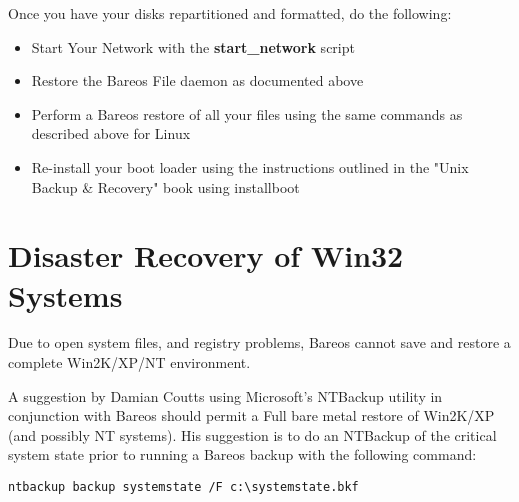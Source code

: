 Once you have your disks repartitioned and formatted, do the following:

\begin{itemize}
\item Start Your Network with the {\bf start\_network} script
\item Restore the Bareos File daemon as documented above
\item Perform a Bareos restore of all your files using the same  commands as
   described above for Linux
\item Re-install your boot loader using the instructions outlined  in the
   "Unix Backup \& Recovery" book  using installboot
\end{itemize}



\section{Disaster Recovery of Win32 Systems}
\label{Win3233}

Due to open system files, and registry problems, Bareos cannot save and
restore a complete Win2K/XP/NT environment.

A suggestion by Damian Coutts using Microsoft's NTBackup utility in
conjunction with Bareos should permit a Full bare metal restore of Win2K/XP
(and possibly NT systems). His suggestion is to do an NTBackup of the critical
system state prior to running a Bareos backup with the following command:

\footnotesize
\begin{verbatim}
ntbackup backup systemstate /F c:\systemstate.bkf
\end{verbatim}
\normalsize

